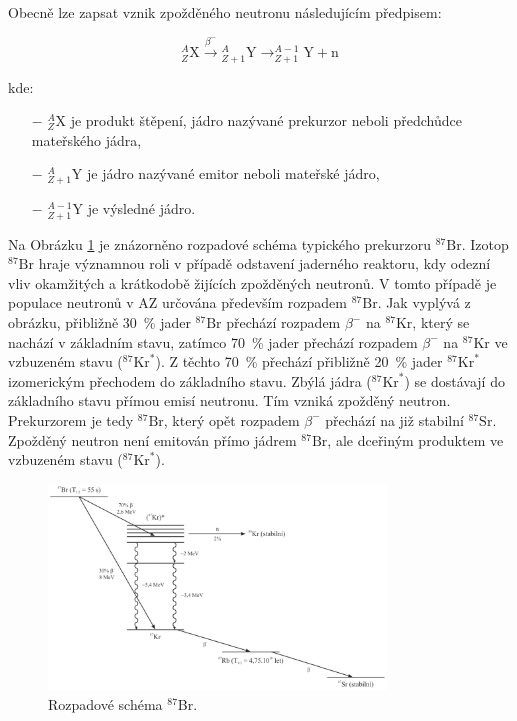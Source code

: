 Obecně lze zapsat vznik zpožděného neutronu následujícím předpisem:

\[
^A_Z\text{X} \xrightarrow{\beta^-} {}^{A}_{Z+1}\text{Y} \rightarrow ^{A-1}_{Z+1}\text{Y} + \text{n}
\]

kde:

\begin{itemize}%
    \item[$-$] $^A_Z\text{X}$ je produkt štěpení, jádro nazývané prekurzor neboli předchůdce mateřského jádra,
    \item[$-$] $^{A}_{Z+1}\text{Y}$ je jádro nazývané emitor neboli mateřské jádro,
    \item[$-$] $^{A-1}_{Z+1}\text{Y}$ je výsledné jádro.
\end{itemize}

Na Obrázku \ref{SNM} je znázorněno rozpadové schéma typického prekurzoru $^{87}\text{Br}$. Izotop $^{87}\text{Br}$ hraje významnou roli v případě odstavení jaderného reaktoru, kdy odezní vliv okamžitých a krátkodobě žijících zpožděných neutronů. V tomto případě je populace neutronů v AZ určována především rozpadem $^{87}\text{Br}$. Jak vyplývá z obrázku, přibližně 30~\% jader $^{87}\text{Br}$ přechází rozpadem $\beta^-$ na $^{87}\text{Kr}$, který se nachází v základním stavu, zatímco 70~\% jader přechází rozpadem $\beta^-$ na $^{87}\text{Kr}$ ve vzbuzeném stavu ($^{87}\text{Kr}^*$). Z těchto 70~\% přechází přibližně 20~\% jader $^{87}\text{Kr}^*$ izomerickým přechodem do základního stavu. Zbýlá jádra ($^{87}\text{Kr}^*$) se dostávají do základního stavu přímou emisí neutronu. Tím vzniká zpožděný neutron. Prekurzorem je tedy $^{87}\text{Br}$, který opět rozpadem $\beta^-$ přechází na již stabilní $^{87}\text{Sr}$. Zpožděný neutron není emitován přímo jádrem $^{87}\text{Br}$, ale dceřiným produktem ve vzbuzeném stavu ($^{87}\text{Kr}^*$).

\begin{figure}[H] 
    \centering
    \includegraphics[width=0.8\textwidth]{img/ZpožděnéNeutrony.png}
    \caption{Rozpadové schéma $^{87}$Br.}
    \label{SNM}
\end{figure}

